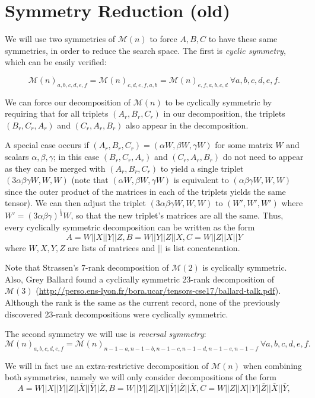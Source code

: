 \documentclass{article}
\begin{document}
\section{Symmetry Reduction (old)}
We will use two symmetries of $\mathcal{M}(n)$ to force $A,B,C$ to have these same symmetries, in order to reduce the search space. The first is \textit{cyclic symmetry}, which can be easily verified:

\[\mathcal{M}(n)_{a,b,c,d,e,f}=\mathcal{M}(n)_{c,d,e,f,a,b}=\mathcal{M}(n)_{e,f,a,b,c,d}\ \forall a,b,c,d,e,f.\]

We can force our decomposition of $\mathcal{M}(n)$ to be cyclically symmetric by requiring that for all triplets $(A_r,B_r,C_r)$ in our decomposition, the triplets $(B_r,C_r,A_r)$ and $(C_r,A_r,B_r)$ also appear in the decomposition.

A special case occurs if $(A_r,B_r,C_r)=(\alpha W,\beta W,\gamma W)$ for some matrix $W$ and scalars $\alpha,\beta,\gamma$; in this case $(B_r,C_r,A_r)$ and $(C_r,A_r,B_r)$ do not need to appear as they can be merged with $(A_r,B_r,C_r)$ to yield a single triplet $(3\alpha\beta\gamma W,W,W)$ (note that $(\alpha W,\beta W,\gamma W)$ is equivalent to $(\alpha\beta\gamma W,W,W)$ since the outer product of the matrices in each of the triplets yields the same tensor). We can then adjust the triplet $(3\alpha\beta\gamma W,W,W)$ to $(W',W',W')$ where 
$W'=(3\alpha\beta\gamma)^{\frac{1}{3}}W$, so that the new triplet's matrices are all the same. Thus, every cyclically symmetric decomposition can be written as the form
\[A=W||X||Y||Z,B=W||Y||Z||X,C=W||Z||X||Y\]
where $W,X,Y,Z$ are lists of matrices and $||$ is list concatenation.

Note that Strassen's 7-rank decomposition of $\mathcal{M}(2)$ is cyclically symmetric. Also, Grey Ballard found a cyclically symmetric 23-rank decomposition of $\mathcal{M}(3)$ (\url{http://perso.ens-lyon.fr/bora.ucar/tensors-cse17/ballard-talk.pdf}). Although the rank is the same as the current record, none of the previously discovered 23-rank decompositions were cyclically symmetric.

The second symmetry we will use is \textit{reversal symmetry}:
\[\mathcal{M}(n)_{a,b,c,d,e,f}=\mathcal{M}(n)_{n-1-a,n-1-b,n-1-c,n-1-d,n-1-e,n-1-f}\ \forall a,b,c,d,e,f.\]

We will in fact use an extra-restrictive decomposition of $\mathcal{M}(n)$ when combining both symmetries, namely we will only consider decompositions of the form
\[A=W||X||Y||Z||\overline{X}||\overline{Y}||\overline{Z},B=W||Y||Z||X||\overline{Y}||\overline{Z}||\overline{X},C=W||Z||X||Y||\overline{Z}||\overline{X}||\overline{Y},\]
\end{document}
